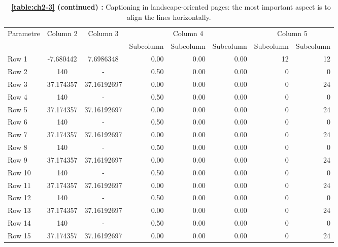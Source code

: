 \begin{landscape}
\thispagestyle{empty}
\vspace{6pt} %
\begin{table}[htp]
\centering
\setlength{\tabcolsep}{14pt}
\captionsetup{justification=centerlast}
\caption*{\textbf{\tablename\ \ref{table:ch2-3} (continued) : } Captioning in landscape-oriented pages: the most important aspect is to align the lines horizontally.}
\begin{tabular}{lccrrrrr}
\toprule\midrule
\multirow{2}{*}{Parametre} & \multirow{2}{*}{Column 2} & \multirow{2}{*}{Column 3} & \multicolumn{3}{c}{Column 4} & \multicolumn{2}{c}{Column 5}\\ \cmidrule(lr){4-6} \cmidrule(lr){7-8}
  & & & Subcolumn & Subcolumn & Subcolumn & Subcolumn & Subcolumn\\
\midrule
Row 1 & -7.680442 & 7.6986348 & 0.00 & 0.00 & 0.00 & 12 & 12 \\
Row 2 & 140 & - & 0.50 & 0.00 & 0.00 & 0 & 0 \\
Row 3 & 37.174357 & 37.16192697 & 0.00 & 0.00 & 0.00 & 0 & 24 \\
Row 4 & 140 & - & 0.50 & 0.00 & 0.00 & 0 & 0 \\
Row 5 & 37.174357 & 37.16192697 & 0.00 & 0.00 & 0.00 & 0 & 24 \\
Row 6 & 140 & - & 0.50 & 0.00 & 0.00 & 0 & 0 \\
Row 7 & 37.174357 & 37.16192697 & 0.00 & 0.00 & 0.00 & 0 & 24 \\
Row 8 & 140 & - & 0.50 & 0.00 & 0.00 & 0 & 0 \\
Row 9 & 37.174357 & 37.16192697 & 0.00 & 0.00 & 0.00 & 0 & 24 \\
Row 10 & 140 & - & 0.50 & 0.00 & 0.00 & 0 & 0 \\
Row 11 & 37.174357 & 37.16192697 & 0.00 & 0.00 & 0.00 & 0 & 24 \\
Row 12 & 140 & - & 0.50 & 0.00 & 0.00 & 0 & 0 \\
Row 13 & 37.174357 & 37.16192697 & 0.00 & 0.00 & 0.00 & 0 & 24 \\
Row 14 & 140 & - & 0.50 & 0.00 & 0.00 & 0 & 0 \\
Row 15 & 37.174357 & 37.16192697 & 0.00 & 0.00 & 0.00 & 0 & 24 \\
\bottomrule
\end{tabular}
\end{table}
\vspace{-6pt} %
\vfill\hbox{ }

\ifodd\value{page} %
\end{landscape}

